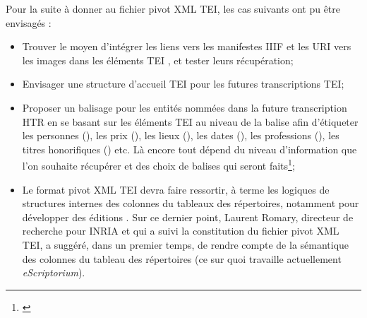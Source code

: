 Pour la suite à donner au fichier pivot XML TEI, les cas suivants ont pu être envisagés :
\begin{itemize}
    \item Trouver le moyen d'intégrer les liens vers les manifestes IIIF et les URI vers les images dans les éléments TEI , et tester leurs récupération;\\
    \item Envisager une structure d'accueil TEI pour les futures transcriptions TEI;\\
    \item Proposer un balisage pour les entités nommées dans la future transcription HTR en se basant sur les éléments TEI au niveau de la balise  afin d'étiqueter les personnes (), les prix (), les lieux (), les dates (), les professions (), les titres honorifiques () etc. Là encore tout dépend du niveau d'information que l'on souhaite récupérer et des choix de balises qui seront faits\footnote{\cite{le_pevedic_retour_2016}};\\
    \item Le format pivot XML TEI devra faire ressortir, à terme les logiques de structures internes des colonnes du tableaux des répertoires, notamment pour développer des éditions . Sur ce dernier point, Laurent Romary, directeur de recherche pour INRIA et qui a suivi la constitution du fichier pivot XML TEI, a suggéré, dans un premier temps, de rendre compte de la sémantique des colonnes du tableau des répertoires (ce sur quoi travaille actuellement \textit{eScriptorium}). 
    

\end{itemize}

